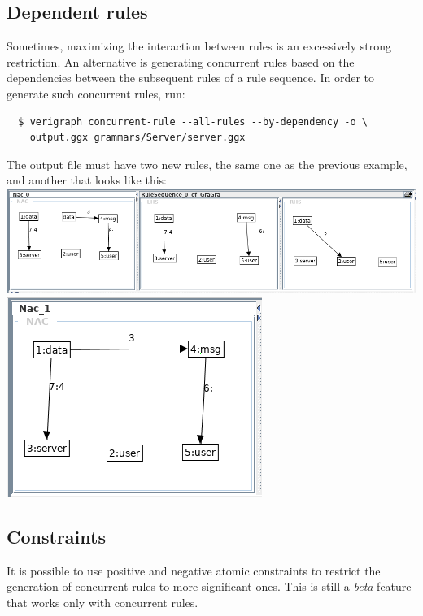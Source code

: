 \documentclass[12pt]{article}
\begin{document}
\subsection{Dependent rules}

Sometimes, maximizing the interaction between rules is an excessively strong restriction. An alternative is generating concurrent rules based on the dependencies between the subsequent rules of a rule sequence. In order to generate such concurrent rules, run:

\begin{verbatim}
  $ verigraph concurrent-rule --all-rules --by-dependency -o \ 
  	output.ggx grammars/Server/server.ggx
\end{verbatim}

The output file must have two new rules, the same one as the previous example, and another that looks like this:\\

\noindent
\includegraphics[scale = 0.4]{img/concurrent-rules/rule-sequence_05a.png}\\
\noindent
\includegraphics[scale = 0.4]{img/concurrent-rules/rule-sequence_05b.png}\\

\pagebreak

\subsection{Constraints}

It is possible to use positive and negative atomic constraints to restrict the generation of concurrent rules to more significant ones. This is still a \textit{beta} feature that works only with concurrent rules.\\
\end{document}
